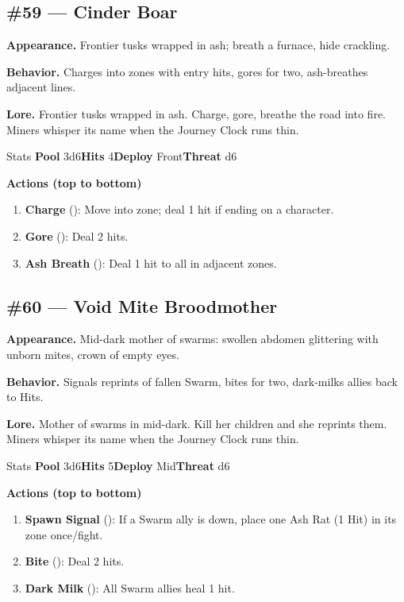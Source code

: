\subsection*{\#59 --- Cinder Boar}

\textbf{Appearance.} Frontier tusks wrapped in ash; breath a furnace, hide crackling.

\textbf{Behavior.} Charges into zones with entry hits, gores for two, ash-breathes adjacent lines.

\textbf{Lore.} Frontier tusks wrapped in ash. Charge, gore, breathe the road into fire. Miners whisper its name when the Journey Clock runs thin.

\begin{monsterentry}{Stats}
\textbf{Pool} 3d6\quad\textbf{Hits} 4\quad\textbf{Deploy} Front\quad\textbf{Threat} d6

\textbf{Actions (top to bottom)}
\begin{enumerate}\setlength{\itemsep}{0.15em}\setlength{\parskip}{0pt}
  \item \textbf{Charge} (\easy): Move into zone; deal 1 hit if ending on a character.
  \item \textbf{Gore} (\medium): Deal 2 hits.
  \item \textbf{Ash Breath} (\hard): Deal 1 hit to all in adjacent zones.
\end{enumerate}
\end{monsterentry}

\subsection*{\#60 --- Void Mite Broodmother}

\textbf{Appearance.} Mid-dark mother of swarms: swollen abdomen glittering with unborn mites, crown of empty eyes.

\textbf{Behavior.} Signals reprints of fallen Swarm, bites for two, dark-milks allies back to Hits.

\textbf{Lore.} Mother of swarms in mid-dark. Kill her children and she reprints them. Miners whisper its name when the Journey Clock runs thin.

\begin{monsterentry}{Stats}
\textbf{Pool} 3d6\quad\textbf{Hits} 5\quad\textbf{Deploy} Mid\quad\textbf{Threat} d6

\textbf{Actions (top to bottom)}
\begin{enumerate}\setlength{\itemsep}{0.15em}\setlength{\parskip}{0pt}
  \item \textbf{Spawn Signal} (\easy): If a Swarm ally is down, place one Ash Rat (1 Hit) in its zone once/fight.
  \item \textbf{Bite} (\medium): Deal 2 hits.
  \item \textbf{Dark Milk} (\hard): All Swarm allies heal 1 hit.
\end{enumerate}
\end{monsterentry}

